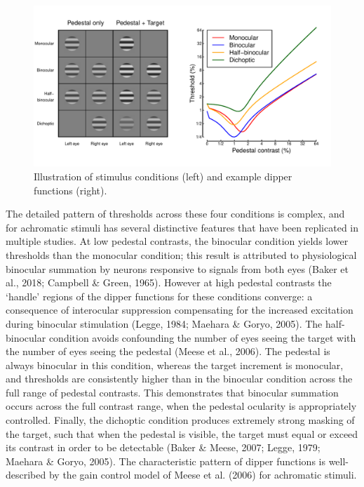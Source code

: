 \documentclass[
]{article}
\begin{document}
\begin{figure}

{\centering \includegraphics{Figures/exampledips} 

}

\caption{Illustration of stimulus conditions (left) and example dipper functions (right).}\label{fig:exampledips}
\end{figure}

The detailed pattern of thresholds across these four conditions is complex, and for achromatic stimuli has several distinctive features that have been replicated in multiple studies. At low pedestal contrasts, the binocular condition yields lower thresholds than the monocular condition; this result is attributed to physiological binocular summation by neurons responsive to signals from both eyes (Baker et al., 2018; Campbell \& Green, 1965). However at high pedestal contrasts the `handle' regions of the dipper functions for these conditions converge: a consequence of interocular suppression compensating for the increased excitation during binocular stimulation (Legge, 1984; Maehara \& Goryo, 2005). The half-binocular condition avoids confounding the number of eyes seeing the target with the number of eyes seeing the pedestal (Meese et al., 2006). The pedestal is always binocular in this condition, whereas the target increment is monocular, and thresholds are consistently higher than in the binocular condition across the full range of pedestal contrasts. This demonstrates that binocular summation occurs across the full contrast range, when the pedestal ocularity is appropriately controlled. Finally, the dichoptic condition produces extremely strong masking of the target, such that when the pedestal is visible, the target must equal or exceed its contrast in order to be detectable (Baker \& Meese, 2007; Legge, 1979; Maehara \& Goryo, 2005). The characteristic pattern of dipper functions is well-described by the gain control model of Meese et al. (2006) for achromatic stimuli.
\end{document}
